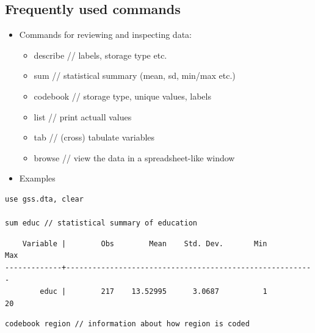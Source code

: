 \documentclass[]{book}
\providecommand{\tightlist}{%
  \setlength{\itemsep}{0pt}\setlength{\parskip}{0pt}}
\begin{document}
\subsection{Frequently used commands}\label{frequently-used-commands}

\begin{itemize}
\tightlist
\item
  Commands for reviewing and inspecting data:

  \begin{itemize}
  \tightlist
  \item
    describe // labels, storage type etc.
  \item
    sum // statistical summary (mean, sd, min/max etc.)
  \item
    codebook // storage type, unique values, labels
  \item
    list // print actuall values
  \item
    tab // (cross) tabulate variables
  \item
    browse // view the data in a spreadsheet-like window
  \end{itemize}
\item
  Examples
\end{itemize}

\begin{verbatim}
use gss.dta, clear

sum educ // statistical summary of education
\end{verbatim}

\begin{verbatim}
    Variable |        Obs        Mean    Std. Dev.       Min        Max
-------------+---------------------------------------------------------
        educ |        217    13.52995      3.0687          1         20
\end{verbatim}

\begin{verbatim}
codebook region // information about how region is coded
\end{verbatim}
\end{document}
